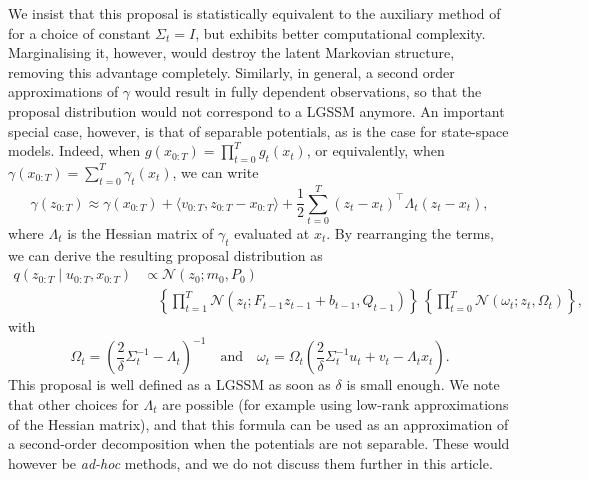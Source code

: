 We insist that this proposal is statistically equivalent to the auxiliary method of \citet{titsias2018} for a choice of constant $\Sigma_t = I$, but exhibits better computational complexity. Marginalising it, however, would destroy the latent Markovian structure, removing this advantage completely. Similarly, in general, a second order approximations of $\gamma$  would result in fully dependent observations, so that the proposal distribution would not correspond to a LGSSM anymore.
An important special case, however, is that of separable potentials, as is the case for state-space models. Indeed, when $g(x_{0:T}) = \prod_{t=0}^T g_t(x_t)$, or equivalently, when $\gamma(x_{0:T}) = \sum_{t=0}^T \gamma_t(x_t)$, we can write
\begin{equation}
    \label{eq:linearised-log-potential-second}
    \gamma(z_{0:T}) \approx \gamma(x_{0:T}) + \langle v_{0:T}, z_{0:T} - x_{0:T}\rangle + \frac{1}{2} \sum_{t=0}^T (z_t - x_t)^{\top} \Lambda_t (z_t - x_t),
\end{equation}
where $\Lambda_t$ is the Hessian matrix of $\gamma_t$ evaluated at $x_t$. By rearranging the terms, we can derive the resulting proposal distribution as
\begin{equation}
    \label{eq:second-order}
    \begin{split}
        q(z_{0:T} \mid u_{0:T}, x_{0:T}) &\propto \mathcal{N}(z_0; m_0, P_0) \\
        &\quad\left\{\prod_{t=1}^T \mathcal{N}(z_t ; F_{t-1}z_{t-1} + b_{t-1}, Q_{t-1})\right\}\,\left\{\prod_{t=0}^T\mathcal{N}\left(\omega_{t}; z_{t}, \Omega_t\right)\right\},
    \end{split}
\end{equation}
with
\begin{equation}
    \Omega_t = \left(\frac{2}{\delta} \Sigma_t^{-1} - \Lambda_t\right)^{-1} \quad \text{and} \quad \omega_t = \Omega_t\left(\frac{2}{\delta} \Sigma_t^{-1} u_t + v_t - \Lambda_t x_t\right).
\end{equation}
This proposal is well defined as a LGSSM as soon as $\delta$ is small enough.
We note that other choices for $\Lambda_t$ are possible (for example using low-rank approximations of the Hessian matrix), and that this formula can be used as an approximation of a second-order decomposition when the potentials are not separable. These would however be \textit{ad-hoc} methods, and we do not discuss them further in this article.

